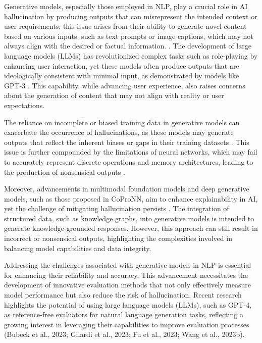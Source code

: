 Generative models, especially those employed in NLP, play a crucial role in AI hallucination by producing outputs that can misrepresent the intended context or user requirements; this issue arises from their ability to generate novel content based on various inputs, such as text prompts or image captions, which may not always align with the desired or factual information. \cite{ramesh2021zero,palmini2024patternscreativityuserinput}. The development of large language models (LLMs) has revolutionized complex tasks such as role-playing by enhancing user interaction, yet these models often produce outputs that are ideologically consistent with minimal input, as demonstrated by models like GPT-3 . This capability, while advancing user experience, also raises concerns about the generation of content that may not align with reality or user expectations.



The reliance on incomplete or biased training data in generative models can exacerbate the occurrence of hallucinations, as these models may generate outputs that reflect the inherent biases or gaps in their training datasets \cite{pandy2024advancementsroboticsprocessautomation}. This issue is further compounded by the limitations of neural networks, which may fail to accurately represent discrete operations and memory architectures, leading to the production of nonsensical outputs \cite{stogin2022provablystableneuralnetwork}.



Moreover, advancements in multimodal foundation models and deep generative models, such as those proposed in CoProNN, aim to enhance explainability in AI, yet the challenge of mitigating hallucination persists \cite{chiaburu2024copronnconceptbasedprototypicalnearest}. The integration of structured data, such as knowledge graphs, into generative models is intended to generate knowledge-grounded responses. However, this approach can still result in incorrect or nonsensical outputs, highlighting the complexities involved in balancing model capabilities and data integrity.



Addressing the challenges associated with generative models in NLP is essential for enhancing their reliability and accuracy. This advancement necessitates the development of innovative evaluation methods that not only effectively measure model performance but also reduce the risk of hallucination. Recent research highlights the potential of using large language models (LLMs), such as GPT-4, as reference-free evaluators for natural language generation tasks, reflecting a growing interest in leveraging their capabilities to improve evaluation processes (Bubeck et al., 2023; Gilardi et al., 2023; Fu et al., 2023; Wang et al., 2023b). \cite{oh2024generativeaiparadoxevaluation}



